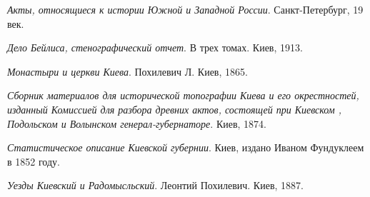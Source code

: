 \emph{Акты, относящиеся к истории Южной и Западной России}. Санкт-Петербург, 19 век. 

\emph{Дело Бейлиса, стенографический отчет}. В трех томах. Киев, 1913.

\emph{Монастыри и церкви Киева}. Похилевич Л. Киев, 1865.

\emph{Сборник материалов для исторической топографии Киева и его окрестностей, изданный Комиссией для разбора древних актов, состоящей при Киевском , Подольском и Волынском генерал-губернаторе}. Киев, 1874.

\emph{Статистическое описание Киевской губернии}. Киев, издано Иваном Фундуклеем в 1852 году.

\emph{Уезды Киевский и Радомысльский}. Леонтий Похилевич. Киев, 1887.

